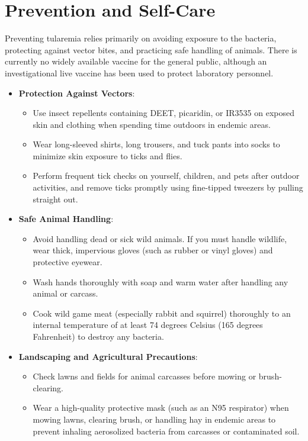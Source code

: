 \section*{Prevention and Self-Care}
Preventing tularemia relies primarily on avoiding exposure to the bacteria, protecting against vector bites, and practicing safe handling of animals. There is currently no widely available vaccine for the general public, although an investigational live vaccine has been used to protect laboratory personnel.
\begin{itemize}
    \item \textbf{Protection Against Vectors}:
    \begin{itemize}
        \item Use insect repellents containing DEET, picaridin, or IR3535 on exposed skin and clothing when spending time outdoors in endemic areas.
        \item Wear long-sleeved shirts, long trousers, and tuck pants into socks to minimize skin exposure to ticks and flies.
        \item Perform frequent tick checks on yourself, children, and pets after outdoor activities, and remove ticks promptly using fine-tipped tweezers by pulling straight out.
    \end{itemize}
    \item \textbf{Safe Animal Handling}:
    \begin{itemize}
        \item Avoid handling dead or sick wild animals. If you must handle wildlife, wear thick, impervious gloves (such as rubber or vinyl gloves) and protective eyewear.
        \item Wash hands thoroughly with soap and warm water after handling any animal or carcass.
        \item Cook wild game meat (especially rabbit and squirrel) thoroughly to an internal temperature of at least 74 degrees Celsius (165 degrees Fahrenheit) to destroy any bacteria.
    \end{itemize}
    \item \textbf{Landscaping and Agricultural Precautions}:
    \begin{itemize}
        \item Check lawns and fields for animal carcasses before mowing or brush-clearing.
        \item Wear a high-quality protective mask (such as an N95 respirator) when mowing lawns, clearing brush, or handling hay in endemic areas to prevent inhaling aerosolized bacteria from carcasses or contaminated soil.

\end{itemize}
\end{itemize}

